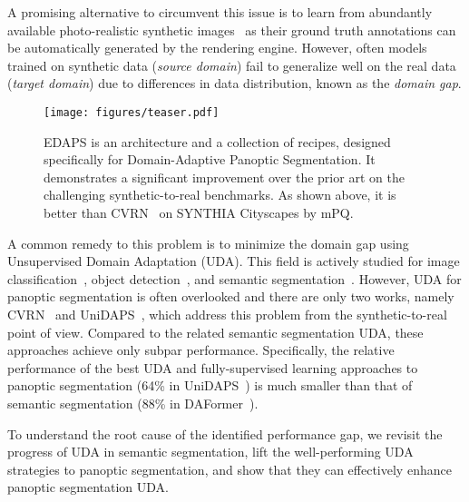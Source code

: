 \documentclass[10pt,twocolumn,letterpaper]{article}
\begin{document}
A promising alternative to circumvent this issue is  
to learn from abundantly available photo-realistic synthetic images~\cite{ros2016synthia,richter2016playing} as their ground truth annotations can be automatically generated by the rendering engine.
However, often models trained on synthetic data (\emph{source domain})
fail to generalize well on the real data (\emph{target domain}) due to differences in data distribution, known as the \textit{domain gap}.

\begin{figure}[t]
  \centering
   \texttt{[image: figures/teaser.pdf]}
   \caption{
   EDAPS is an architecture and a collection of recipes, designed specifically for Domain-Adaptive Panoptic Segmentation. 
   It demonstrates a significant improvement over the prior art on the challenging synthetic-to-real benchmarks.
   As shown above, it is better than CVRN~\cite{huang2021cross} on SYNTHIA  Cityscapes by  mPQ. 
   }
   \label{fig:teaser}
\end{figure}


A common remedy to this problem is to minimize the domain gap using Unsupervised Domain Adaptation (UDA).
This field is actively studied for 
image classification~\cite{
long2015learning,ganin2016domain,long2018conditional,saito2018maximum,pan2019transferrable}, 
object detection~\cite{
chen2018domain,saito2019strong, xu2020cross, chen2021scale, li2022cross}, 
and semantic segmentation~\cite{
hoffman2016fcns,tsai2018learning,hoffman2018cycada,li2019bidirectional,saha2021learning,tranheden2021dacs,hoyer2021daformer}.
However, UDA for panoptic segmentation is often overlooked and there are only two works, namely CVRN~\cite{huang2021cross} and UniDAPS~\cite{zhang2022hierarchical}, which address this problem from the synthetic-to-real point of view. 
Compared to the related semantic segmentation UDA, these approaches achieve only subpar performance. 
Specifically, the relative performance of the best UDA and fully-supervised learning approaches to panoptic segmentation (64\% in UniDAPS~\cite{zhang2022hierarchical}) is much smaller than that of semantic segmentation (88\% in DAFormer~\cite{hoyer2021daformer}).

To understand the root cause of the identified performance gap, we revisit the progress of UDA in semantic segmentation, lift the well-performing UDA strategies to panoptic segmentation, and show that they can effectively enhance panoptic segmentation UDA.
\end{document}
